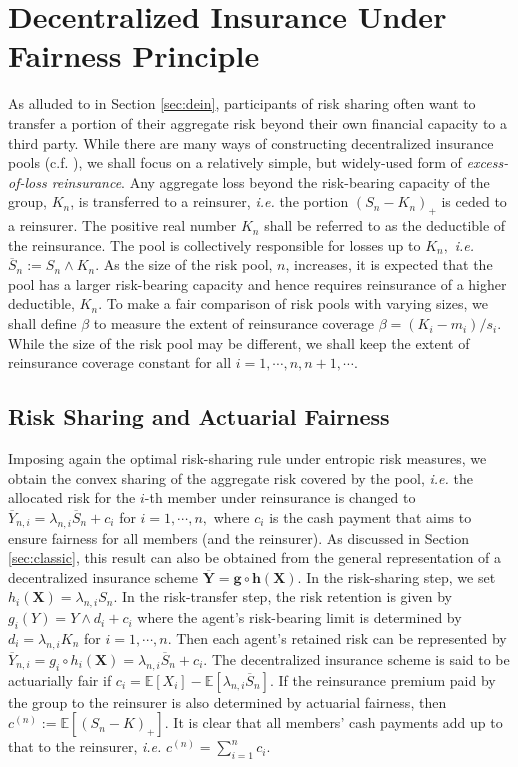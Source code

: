 \documentclass[fleqn,mnsc,nonblindrev]{informs4}
\newcommand{\EE}{\mathbb{E}}
\begin{document}
\section{Decentralized Insurance Under Fairness Principle}\label{sec:reinsurance}
As alluded to in Section \ref{sec:dein}, participants of risk sharing often want to transfer a portion of their aggregate risk beyond their own financial capacity to a third party. While there are many ways of constructing decentralized insurance pools (c.f. \cite{feng2024unified}), we shall focus on a relatively simple, but widely-used form of {\it excess-of-loss reinsurance}. Any aggregate loss beyond the risk-bearing capacity of the group, $K_n$, is transferred to a reinsurer, {\it i.e.} the portion $(S_n-K_n)_+$ is ceded to a reinsurer. The positive real number $K_n$ shall be referred to as the deductible of the reinsurance. The pool is collectively responsible for losses up to $K_n,$ {\it i.e.} $\overline{S}_n:=S_n \wedge K_n.$ 
As the size of the risk pool, $n$, increases, it is expected that the pool has a larger risk-bearing capacity and hence requires reinsurance of a higher deductible, $K_n$. To make a fair comparison of risk pools with varying sizes, we shall define $\beta$ to measure the extent of reinsurance coverage  {$\beta=(K_i-m_i)/s_i$.} While the size of the risk pool may be different, we shall keep the extent of reinsurance coverage constant for all $i=1,\cdots, n, n+1,\cdots.$
\subsection{Risk Sharing and Actuarial Fairness}
Imposing again the optimal risk-sharing rule under entropic risk measures, we obtain the convex sharing of the aggregate risk covered by the pool, {\it i.e.} the allocated risk for the $i$-th member under reinsurance is changed to $\overline{Y}_{n,i}=\lambda_{n,i} \overline{S}_n+c_i$ for $i=1,\cdots, n,$ where $c_i$ is the cash payment that aims to ensure fairness for all members (and the reinsurer). As discussed in Section \ref{sec:classic}, this result can also be obtained from the general representation of a decentralized insurance scheme $\overline{\mathbf{Y}}=\mathbf{g}\circ \mathbf{h}(\mathbf{X})$. In the risk-sharing step, we set $h_i(\mathbf{X})=\lambda_{n,i} S_n$. In the risk-transfer step, the risk retention is given by $g_i(Y)=Y\wedge d_i+c_i$ where the agent's risk-bearing limit is determined by $d_i=\lambda_{n,i}K_n$  for $i=1,\cdots, n.$ Then each agent's retained risk can be represented by $\overline{Y}_{n,i}= g_i\circ h_i(\mathbf{X})=\lambda_{n,i} \overline{S}_n+c_i.$ The decentralized insurance scheme is said to be actuarially fair if $c_i=\mathbb{E}[X_i]-\mathbb{E} [\lambda_{n,i}\overline{S}_n].$
If the reinsurance premium paid by the group to the reinsurer is also determined by actuarial fairness, then $c^{(n)}:=\EE[(S_n-K)_+].$ It is clear that all members' cash payments add up to that to the reinsurer, {\it i.e.} $c^{(n)}=\sum^n_{i=1} c_i.$
\end{document}

